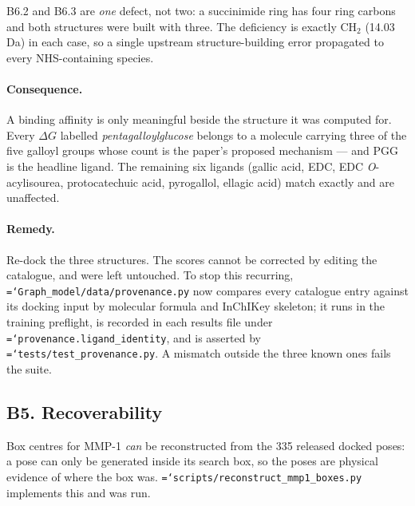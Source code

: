 \documentclass[11pt,a4paper]{article}
\newcommand{\ok}[1]{\textcolor{okgreen}{#1}}
\newcommand{\code}[1]{\texttt{\small\hyphenchar\font=`\-\relax #1}}
\begin{document}
B6.2 and B6.3 are \emph{one} defect, not two: a succinimide ring has four ring
carbons and both structures were built with three. The deficiency is exactly
$\mathrm{CH_2}$ (14.03\,Da) in each case, so a single upstream
structure-building error propagated to every NHS-containing species.

\paragraph{Consequence.} A binding affinity is only meaningful beside the
structure it was computed for. Every $\Delta G$ labelled
\emph{pentagalloylglucose} belongs to a molecule carrying three of the five
galloyl groups whose count is the paper's proposed mechanism --- and PGG is the
headline ligand. The remaining six ligands (gallic acid, EDC, EDC
\emph{O}-acylisourea, protocatechuic acid, pyrogallol, ellagic acid)
\ok{match exactly} and are unaffected.

\paragraph{Remedy.} Re-dock the three structures. The scores cannot be
corrected by editing the catalogue, and were left untouched. To stop this
recurring, \code{Graph\_model/data/provenance.py} now compares every catalogue
entry against its docking input by molecular formula and InChIKey skeleton;
it runs in the training preflight, is recorded in each results file under
\code{provenance.ligand\_identity}, and is asserted by
\code{tests/test\_provenance.py}. A mismatch outside the three known ones
fails the suite.

\subsection{B5. Recoverability}

Box centres for MMP-1 \emph{can} be reconstructed from the 335 released
docked poses: a pose can only be generated inside its search box, so the poses
are physical evidence of where the box was.
\code{scripts/reconstruct\_mmp1\_boxes.py} implements this and was run.
\end{document}
